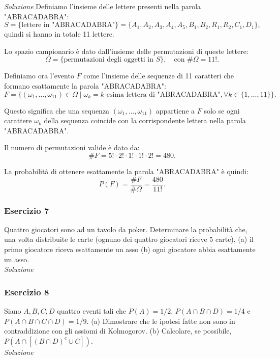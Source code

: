 \textit{Soluzione} \quad Definiamo l'insieme delle lettere presenti nella parola "ABRACADABRA":
\[
S= \{ \text{lettere in "ABRACADABRA"} \} = \{A_1,A_2,A_3,A_4,A_5,B_1,B_2,R_1,R_2,C_1,D_1\},
\]
quindi si hanno in totale 11 lettere.

Lo spazio campionario è dato dall'insieme delle permutazioni di queste lettere:
\[
\Omega = \{\text{permutazioni degli oggetti in } S\}, \quad \text{con } \#\Omega = 11!.
\]

Definiamo ora l'evento $F$ come l'insieme delle sequenze di 11 caratteri che formano esattamente la parola "ABRACADABRA":
\[
F = \{(\omega_1, \dots, \omega_{11}) \in \Omega \mid \omega_k = \text{$k$-esima lettera di "ABRACADABRA"}, \forall k \in \{1, \dots, 11\}\}.
\]

Questo significa che una sequenza $(\omega_1, ..., \omega_{11})$ appartiene a $F$ solo se ogni carattere $\omega_k$ della sequenza coincide con la corrispondente lettera nella parola "ABRACADABRA".

Il numero di permutazioni valide è dato da:
\[
\# F = 5! \cdot 2! \cdot 1! \cdot 1! \cdot 2! = 480.
\]

La probabilità di ottenere esattamente la parola "ABRACADABRA" è quindi:
\[
P(F) = \frac{\#F}{\#\Omega} = \frac{480}{11!}.
\]





\subsubsection{Esercizio 7} Quattro giocatori sono ad un tavolo da poker. Determinare la probabilità che, una volta distribuite le
carte (ognuno dei quattro giocatori riceve 5 carte),
(a) il primo giocatore riceva esattamente un asso (b) ogni giocatore abbia esattamente un asso.
\\

\textit{Soluzione} \quad 

\subsubsection{Esercizio 8}
Siano $A, B, C, D$ quattro eventi tali che $P (A) = 1/2$, $P (A \cap B \cap D) = 1/4$ e $P (A \cap B \cap C \cap D) = 1/9.$
(a) Dimostrare che le ipotesi fatte non sono in contraddizione con gli assiomi di Kolmogorov. (b) Calcolare, se possibile, $P (A \cap [(B \cap D)^c \cup C ])$.
\\

\textit{Soluzione} \quad 

